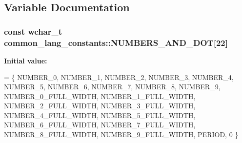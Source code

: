 \subsection{Variable Documentation}
\hypertarget{group___indexing_ga9af668209bd3dbb16602bdd259c90e1e}{
\subsubsection[{N\-U\-M\-B\-E\-R\-S\-\_\-\-A\-N\-D\-\_\-\-D\-O\-T}]{\setlength{\rightskip}{0pt plus 5cm}const wchar\-\_\-t common\-\_\-lang\-\_\-constants\-::\-N\-U\-M\-B\-E\-R\-S\-\_\-\-A\-N\-D\-\_\-\-D\-O\-T\mbox{[}22\mbox{]}}}\label{group___indexing_ga9af668209bd3dbb16602bdd259c90e1e}
{\bfseries Initial value\-:}
\begin{DoxyCode}
= \{
        NUMBER\_0, NUMBER\_1, NUMBER\_2, NUMBER\_3, NUMBER\_4,
        NUMBER\_5, NUMBER\_6, NUMBER\_7, NUMBER\_8, NUMBER\_9,
        NUMBER\_0\_FULL\_WIDTH, NUMBER\_1\_FULL\_WIDTH, NUMBER\_2\_FULL\_WIDTH, NUMBER\_3\_FULL\_WIDTH, 
      NUMBER\_4\_FULL\_WIDTH,
        NUMBER\_5\_FULL\_WIDTH, NUMBER\_6\_FULL\_WIDTH, NUMBER\_7\_FULL\_WIDTH, NUMBER\_8\_FULL\_WIDTH, 
      NUMBER\_9\_FULL\_WIDTH,
        PERIOD, 0 \}
\end{DoxyCode}
